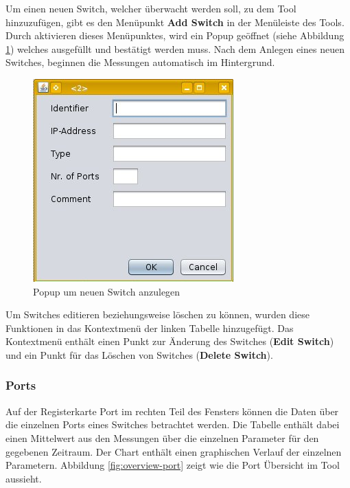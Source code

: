 Um einen neuen Switch, welcher überwacht werden soll, zu dem Tool hinzuzufügen, gibt es den Menüpunkt \textbf{Add Switch} in der Menüleiste des Tools. Durch aktivieren dieses Menüpunktes, wird ein Popup geöffnet (siehe Abbildung \ref{fig:popup}) welches ausgefüllt und bestätigt werden muss. Nach dem Anlegen eines neuen Switches, beginnen die Messungen automatisch im Hintergrund.

 \begin{figure}[h]
    \centering
    \leavevmode
    \includegraphics[scale=0.5]{figures/screenshot3.jpg}
    \caption{Popup um neuen Switch anzulegen}
    \label{fig:popup}
\end{figure}

Um Switches editieren beziehungsweise löschen zu können, wurden diese Funktionen in das Kontextmenü der linken Tabelle hinzugefügt. Das Kontextmenü enthält einen Punkt zur Änderung des Switches (\textbf{Edit Switch}) und ein Punkt für das Löschen von Switches (\textbf{Delete Switch}).

\subsubsection{Ports}
\label{sub:ports}
Auf der Registerkarte Port im rechten Teil des Fensters können die Daten über die einzelnen Ports eines Switches betrachtet werden. Die Tabelle enthält dabei einen Mittelwert aus den Messungen über die einzelnen Parameter für den gegebenen Zeitraum. Der Chart enthält einen graphischen Verlauf der einzelnen Parametern. Abbildung \ref{fig:overview-port} zeigt wie die Port Übersicht im Tool aussieht.

